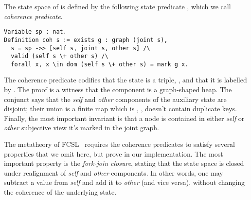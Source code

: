 The state space of  is defined by the following state
predicate , which we call \emph{coherence predicate}.

%
%
%
\begin{lstlisting}
Variable sp : nat.
Definition coh s := exists g : graph (joint s), 
  s = sp ->> [self s, joint s, other s] /\ 
  valid (self s \+ other s) /\ 
  forall x, x \in dom (self s \+ other s) = mark g x.  
\end{lstlisting}
%
The coherence predicate codifies that the state  is a triple,
\code{[self s,}  \code{other s]}, and that it is
labelled by \code{sp}. The proof \code{g} is a witness that the
\code{joint} component is a graph-shaped heap.
%
The conjunct  says that the
\emph{self} and \emph{other} components of the auxiliary state are
disjoint; their union is a finite map which is \code{valid}, \ie,
doesn't contain duplicate keys.
%
Finally, the most important invariant is that a node  is
contained in either \emph{self} or \emph{other} subjective view \Iff
it's marked in the joint graph.
%

The metatheory of FCSL~\cite[\S4]{Nanevski-al:ESOP14} requires the
coherence predicates to satisfy several properties that we omit
here, but prove in our implementation. The most important property is
the \emph{fork-join closure}, stating that the state space is closed
under realignment of \emph{self} and \emph{other} components. In other
words, one may subtract a value from \emph{self} and add it to
\emph{other} (and vice versa), without changing the coherence of the
underlying state.

